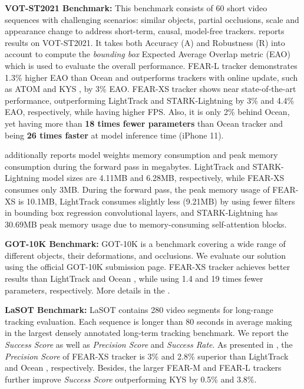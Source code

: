 \documentclass[runningheads]{llncs}
\begin{document}
\textbf{VOT-ST2021 Benchmark:} 
This benchmark consists of 60 short video sequences with challenging scenarios: similar objects, partial occlusions, scale and appearance change to address short-term, causal, model-free trackers. 
 reports results on VOT-ST2021. It takes both Accuracy (A) and Robustness (R) into account to compute the \textit{bounding box} Expected Average Overlap metric (EAO) \cite{VOT} which is used to evaluate the overall performance.
FEAR-L tracker demonstrates 1.3\% higher EAO than Ocean \cite{Ocean} and outperforms trackers with online update, such as ATOM \cite{ATOM} and KYS \cite{KYS}, by 3\% EAO.
FEAR-XS tracker shows near state-of-the-art performance, outperforming LightTrack \cite{LightTrack} and STARK-Lightning \cite{stark_lightning} by 3\% and 4.4\% EAO, respectively, while having higher FPS. Also, it is only 2\% behind Ocean, yet having more than \textbf{18 times fewer parameters} than Ocean tracker and being \textbf{26 times faster} at model inference time (iPhone 11).

 additionally reports model weights memory consumption and peak memory consumption during the forward pass in megabytes. LightTrack and STARK-Lightning model sizes are 4.11MB and 6.28MB, respectively, while FEAR-XS consumes only 3MB. During the forward pass, the peak memory usage of FEAR-XS is 10.1MB, LightTrack consumes slightly less (9.21MB) by using fewer filters in bounding box regression convolutional layers, and STARK-Lightning has 30.69MB peak memory usage due to memory-consuming self-attention blocks.

\textbf{GOT-10K Benchmark:} GOT-10K \cite{GOT10k} is a benchmark covering a wide range of different objects, their deformations, and occlusions. We evaluate our solution using the official GOT-10K submission page. FEAR-XS tracker achieves better results than LightTrack \cite{LightTrack} and Ocean \cite{Ocean}, while using 1.4 and 19 times fewer parameters, respectively. More details in the .

\textbf{LaSOT Benchmark:} LaSOT \cite{LaSOT} contains 280 video segments for long-range tracking evaluation. 
Each sequence is longer than 80 seconds in average making in the largest densely annotated long-term tracking benchmark. 
We report the \textit{Success Score} as well as \textit{Precision Score} and \textit{Success Rate}. As presented in , the \textit{Precision Score} of FEAR-XS tracker is 3\% and 2.8\% superior than LightTrack \cite{LightTrack} and Ocean \cite{Ocean}, respectively. Besides, the larger FEAR-M and FEAR-L trackers further improve \textit{Success Score} outperforming KYS \cite{KYS} by 0.5\% and 3.8\%.
\end{document}
